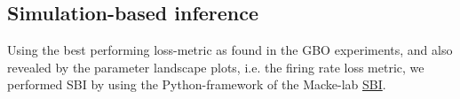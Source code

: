 \documentclass[mphil,deptreport,ianc]{infthesis} %
\begin{document}


\subsection{Simulation-based inference}

Using the best performing loss-metric as found in the GBO experiments, and also revealed by the parameter landscape plots, i.e. the firing rate loss metric, we performed SBI by using the Python-framework of the Macke-lab \href{https://github.com/mackelab/sbi}{SBI}.
\end{document}
